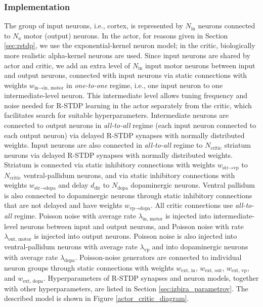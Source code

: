 \documentclass[a4paper,12pt,openright]{book}
\begin{document}
\subsubsection{Implementation}
The group of input neurons, i.e., cortex, is represented by $N_{\text{in}}$ neurons connected to $N_a$ motor (output) neurons. In the actor, for reasons given in Section \ref{sec:rstdp}, we use the exponential-kernel neuron model; in the critic, biologically more realistic alpha-kernel neurons are used. Since input neurons are shared by actor and critic, we add an extra level of $N_{\text{in}}$ input motor neurons between input and output neurons, connected with input neurons via static connections with weights $w_{\text{in}\to\text{in, motor}}$ in \textit{one-to-one} regime, i.e., one input neuron to one intermediate-level neuron. This intermediate level allows tuning frequency and noise needed for R-STDP learning in the actor separately from the critic, which facilitates search for suitable hyperparameters. Intermediate neurons are connected to output neurons in \textit{all-to-all} regime (each input neuron connected to each output neuron) via delayed R-STDP synapses with normally distributed weights. Input neurons are also connected in \textit{all-to-all} regime to $N_{\text{critic}}$ striatum neurons via delayed R-STDP synapses with normally distributed weights. Striatum is connected via static inhibitory connections with weights $w_{\text{str}\to\text{vp}}$ to $N_{\text{critic}}$ ventral-pallidum neurons, and via static inhibitory connections with weights $w_{\text{str}\to\text{dopa}}$ and delay $d_{\text{dir}}$ to $N_{\text{dopa}}$ dopaminergic neurons.
Ventral pallidum is also connected to dopaminergic neurons through static inhibitory connections that are not delayed and have weights $w_{\text{vp}\to\text{dopa}}$. All critic connections use \textit{all-to-all} regime. Poisson noise with average rate $\lambda_{\text{in, motor}}$ is injected into intermediate-level neurons between input and output neurons, and Poisson noise with rate $\lambda_{\text{out, motor}}$ is injected into output neurons. Poisson noise is also injected into ventral-pallidum neurons with average rate $\lambda_{\text{vp}}$ and into dopaminergic neurons with average rate $\lambda_{\text{dopa}}$.
Poisson-noise generators are connected to individual neuron groups through static connections with weights $w_{\text{ext, in}}$, $w_{\text{ext, out}}$, $w_{\text{ext, vp}}$, and $w_{\text{ext, dopa}}$. Hyperparameters of R-STDP synapses and neuron models, together with other hyperparameters, are listed in Section \ref{sec:izbira_parametrov}. The described model is shown in Figure \ref{actor_critic_diagram}.
\end{document}
